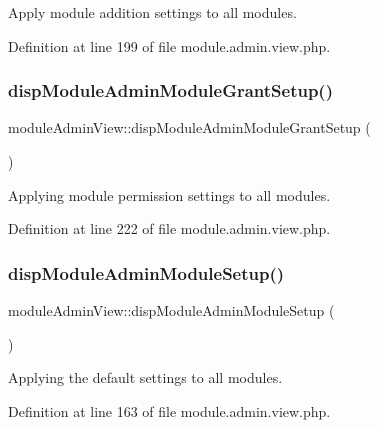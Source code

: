 Apply module addition settings to all modules. 



Definition at line 199 of file module.\+admin.\+view.\+php.

\mbox{\label{classmoduleAdminView_a132b98243602c81f583f4746a04628d7}} 
\subsubsection{\texorpdfstring{disp\+Module\+Admin\+Module\+Grant\+Setup()}{dispModuleAdminModuleGrantSetup()}}
{\footnotesize\ttfamily module\+Admin\+View\+::disp\+Module\+Admin\+Module\+Grant\+Setup (\begin{DoxyParamCaption}{ }\end{DoxyParamCaption})}



Applying module permission settings to all modules. 



Definition at line 222 of file module.\+admin.\+view.\+php.

\mbox{\label{classmoduleAdminView_a3af1bd27e1da3bc8e31815d109a476da}} 
\subsubsection{\texorpdfstring{disp\+Module\+Admin\+Module\+Setup()}{dispModuleAdminModuleSetup()}}
{\footnotesize\ttfamily module\+Admin\+View\+::disp\+Module\+Admin\+Module\+Setup (\begin{DoxyParamCaption}{ }\end{DoxyParamCaption})}



Applying the default settings to all modules. 



Definition at line 163 of file module.\+admin.\+view.\+php.

